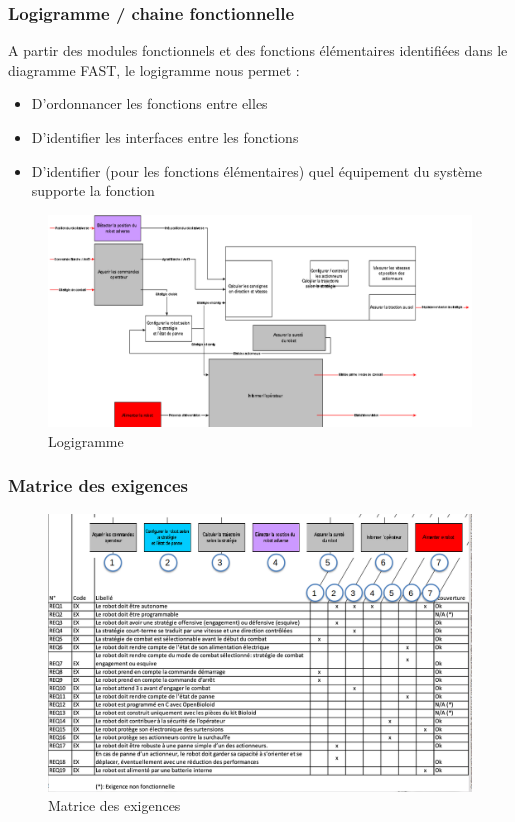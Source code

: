 \subsubsection{Logigramme / chaine fonctionnelle}
A partir des modules fonctionnels et des fonctions élémentaires identifiées dans le diagramme FAST, le logigramme nous permet : 
\begin{itemize}
    \item D'ordonnancer les fonctions entre elles 
    \item D'identifier les interfaces entre les fonctions 
    \item D'identifier (pour les fonctions élémentaires) quel équipement du système supporte la fonction
\end{itemize}
\begin{figure}[!h]
    \begin{center}
        \includegraphics[scale=0.5]{images/logigramme.png}
        \caption{Logigramme}
    \end{center}
    \end{figure}
\subsubsection{Matrice des exigences}
\begin{figure}[!h]
\begin{center}
    \includegraphics[scale=0.5]{images/matrice_exigences.png}
    \caption{Matrice des exigences}
\end{center}
\end{figure}
\clearpage
